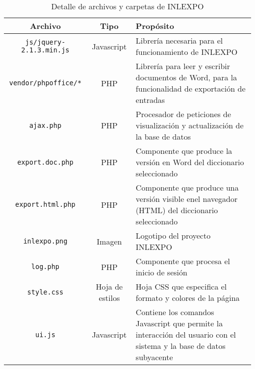 \documentclass[11pt]{article} %
\begin{document}
\begin{table}
\centering
\begin{tabular}{ccp{6cm}} 
\toprule 
Archivo & Tipo &Propósito \\ \midrule 
\texttt{js/jquery-2.1.3.min.js} & Javascript & Librería necesaria para el funcionamiento de INLEXPO\\
\texttt{vendor/phpoffice/*} & PHP & Librería para leer y escribir documentos de Word, para la funcionalidad de exportación de entradas \\
\texttt{ajax.php} & PHP & Procesador de peticiones de visualización y actualización de la base de datos \\
\texttt{export.doc.php} &PHP & Componente que produce la versión en Word del diccionario seleccionado\\
\texttt{export.html.php} & PHP & Componente que produce una versión visible enel navegador (HTML) del diccionario seleccionado \\
\texttt{inlexpo.png} & Imagen & Logotipo del proyecto INLEXPO\\
\texttt{log.php} & PHP & Componente que procesa el inicio de sesión \\
\texttt{style.css} &Hoja de estilos &  Hoja CSS que especifica el formato y colores de la página\\
\texttt{ui.js} &Javascript & Contiene los comandos Javascript que permite la interacción del usuario con el sistema y la base de datos subyacente \\
\bottomrule 
\end{tabular}
\caption{Detalle de archivos y carpetas de INLEXPO}
\end{table}

\end{document}
